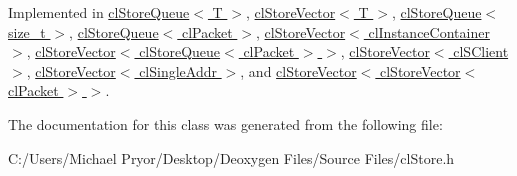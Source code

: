 Implemented in \hyperlink{classcl_store_queue_a22c0e035f508f164ce52768b9799f1c8}{clStoreQueue$<$ T $>$}, \hyperlink{classcl_store_vector_a509567b8c36947d03a05affc5f04d1c4}{clStoreVector$<$ T $>$}, \hyperlink{classcl_store_queue_a22c0e035f508f164ce52768b9799f1c8}{clStoreQueue$<$ size\_\-t $>$}, \hyperlink{classcl_store_queue_a22c0e035f508f164ce52768b9799f1c8}{clStoreQueue$<$ clPacket $>$}, \hyperlink{classcl_store_vector_a509567b8c36947d03a05affc5f04d1c4}{clStoreVector$<$ clInstanceContainer $>$}, \hyperlink{classcl_store_vector_a509567b8c36947d03a05affc5f04d1c4}{clStoreVector$<$ clStoreQueue$<$ clPacket $>$ $>$}, \hyperlink{classcl_store_vector_a509567b8c36947d03a05affc5f04d1c4}{clStoreVector$<$ clSClient $>$}, \hyperlink{classcl_store_vector_a509567b8c36947d03a05affc5f04d1c4}{clStoreVector$<$ clSingleAddr $>$}, and \hyperlink{classcl_store_vector_a509567b8c36947d03a05affc5f04d1c4}{clStoreVector$<$ clStoreVector$<$ clPacket $>$ $>$}.



The documentation for this class was generated from the following file:\begin{DoxyCompactItemize}
\item 
C:/Users/Michael Pryor/Desktop/Deoxygen Files/Source Files/clStore.h\end{DoxyCompactItemize}
